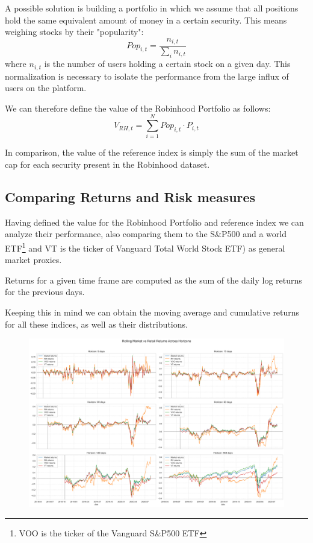 A possible solution is building a portfolio in which we assume that all positions hold the same equivalent amount of money in a certain security. This means weighing stocks by their "popularity":
\begin{equation*}
    Pop_{i,t}=\frac{n_{i,t}}{\sum_in_{i,t}}
\end{equation*}
where $n_{i,t}$ is the number of users holding a certain stock on a given day. This normalization is necessary to isolate the performance from the large influx of users on the platform.

We can therefore define the value of the  Robinhood Portfolio as follows:
\begin{equation*}
    V_{RH,t}=\sum_{i=1}^N Pop_{i,t}\cdot P_{i,t}
\end{equation*}

In comparison, the value of the reference index is simply the sum of the market cap for each security present in the Robinhood dataset. 

\subsection{Comparing Returns and Risk measures}
Having defined the value for the Robinhood Portfolio and reference index we can analyze their performance, also comparing them to the S\&P500 and a world ETF\footnote{VOO is the ticker of the Vanguard S\&P500 ETF} and VT is the ticker of Vanguard Total World Stock ETF) as general market proxies. 

Returns for a given time frame are computed as the sum of the daily log returns for the previous days.

Keeping this in mind we can obtain the moving average and cumulative returns for all these indices, as well as their distributions.

\begin{figure}[h!]
    \centering
    \includegraphics[width=1\linewidth]
    {../images/returns_comparison.png}
    \label{fig:enter-label}
\end{figure}

